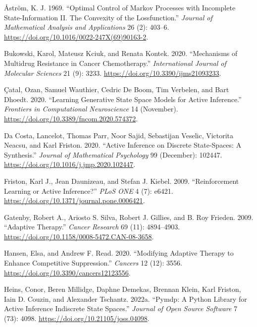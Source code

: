 \documentclass[
]{article}
\newlength{\cslhangindent}
\newenvironment{CSLReferences}[2] %
 {\begin{list}{}{%
  \setlength{\itemindent}{0pt}
  \setlength{\leftmargin}{0pt}
  \setlength{\parsep}{0pt}
  \ifodd #1
   \setlength{\leftmargin}{\cslhangindent}
   \setlength{\itemindent}{-1\cslhangindent}
  \fi
  \setlength{\itemsep}{#2\baselineskip}}}
 {\end{list}}
\begin{document}
\label{refs}
\begin{CSLReferences}{1}{0}
Åström, K. J. 1969. {``Optimal Control of Markov Processes with
Incomplete State-Information II. The Convexity of the Lossfunction.''}
\emph{Journal of Mathematical Analysis and Applications} 26 (2): 403--6.
\url{https://doi.org/10.1016/0022-247X(69)90163-2}.

Bukowski, Karol, Mateusz Kciuk, and Renata Kontek. 2020. {``Mechanisms
of Multidrug Resistance in Cancer Chemotherapy.''} \emph{International
Journal of Molecular Sciences} 21 (9): 3233.
\url{https://doi.org/10.3390/ijms21093233}.

Çatal, Ozan, Samuel Wauthier, Cedric De Boom, Tim Verbelen, and Bart
Dhoedt. 2020. {``Learning Generative State Space Models for Active
Inference.''} \emph{Frontiers in Computational Neuroscience} 14
(November). \url{https://doi.org/10.3389/fncom.2020.574372}.

Da Costa, Lancelot, Thomas Parr, Noor Sajid, Sebastijan Veselic,
Victorita Neacsu, and Karl Friston. 2020. {``Active Inference on
Discrete State-Spaces: A Synthesis.''} \emph{Journal of Mathematical
Psychology} 99 (December): 102447.
\url{https://doi.org/10.1016/j.jmp.2020.102447}.

Friston, Karl J., Jean Daunizeau, and Stefan J. Kiebel. 2009.
{``Reinforcement Learning or Active Inference?''} \emph{PLoS ONE} 4 (7):
e6421. \url{https://doi.org/10.1371/journal.pone.0006421}.

Gatenby, Robert A., Ariosto S. Silva, Robert J. Gillies, and B. Roy
Frieden. 2009. {``Adaptive Therapy.''} \emph{Cancer Research} 69 (11):
4894--4903. \url{https://doi.org/10.1158/0008-5472.CAN-08-3658}.

Hansen, Elsa, and Andrew F. Read. 2020. {``Modifying Adaptive Therapy to
Enhance Competitive Suppression.''} \emph{Cancers} 12 (12): 3556.
\url{https://doi.org/10.3390/cancers12123556}.

Heins, Conor, Beren Millidge, Daphne Demekas, Brennan Klein, Karl
Friston, Iain D. Couzin, and Alexander Tschantz. 2022a. {``Pymdp: A
Python Library for Active Inference Indiscrete State Spaces.''}
\emph{Journal of Open Source Software} 7 (73): 4098.
\url{https://doi.org/10.21105/joss.04098}.


\end{CSLReferences}
\end{document}
